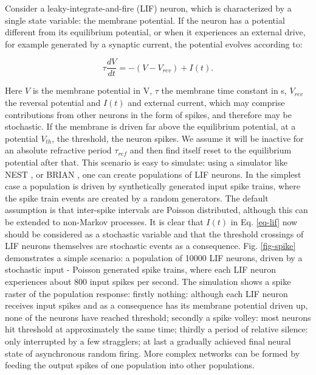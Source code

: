 \documentclass[10pt]{article}
\begin{document}
Consider a leaky-integrate-and-fire (LIF) neuron, which is characterized by a single state variable: the membrane potential.
If the neuron has a potential different from its equilibrium potential, or when it experiences an external drive, for example generated by a synaptic current, the potential evolves according to:

\begin{equation}
\tau \frac{dV}{dt} = -(V - V_{rev}) + I(t).
\label{eq-lif}
\end{equation}

Here $V$ is the membrane potential in V, $\tau$ the membrane time constant in s, $V_{rev}$ the reversal potential and $I(t)$ and external current, which may comprise contributions from other neurons in the form of spikes, and therefore may be stochastic.
If the membrane is driven far above the equilibrium potential, at a potential $V_{th}$, the threshold, the neuron spikes.
We assume it will be inactive for an absolute refractive period $\tau_{ref}$ and then find itself reset to the equilibrium potential after that.  
This scenario is easy to simulate: using a simulator like NEST \cite{nest}, or BRIAN \cite{brian}, one can create populations of LIF neurons.
In the simplest case a population is driven by synthetically generated input spike trains, where the spike train events are created by a random generators.
The default assumption is that inter-spike intervals are Poisson distributed, although this can be extended to non-Markov processes.
It is clear that $I(t)$ in Eq. \ref{eq-lif} now should be considered as a stochastic variable and that the threshold crossings of LIF neurons themselves are stochastic events as a consequence.
Fig. \ref{fig-spike}  demonstrates a simple scenario: a population of 10000 LIF neurons, driven by a stochastic input - Poisson generated spike trains, where each LIF neuron experiences about 800 input spikes per second.
The simulation shows a spike raster of the population response:
firstly nothing: although each LIF neuron receives input spikes and as a consequence has its membrane potential driven up, none of the neurons have reached threshold;
secondly a spike volley: most neurons hit threshold at approximately the same time;
thirdly a period of relative silence: only interrupted by a few stragglers;
at last a gradually achieved final neural state of asynchronous random firing.
More complex networks can be formed by feeding the output spikes of one population into other populations.
\end{document}
